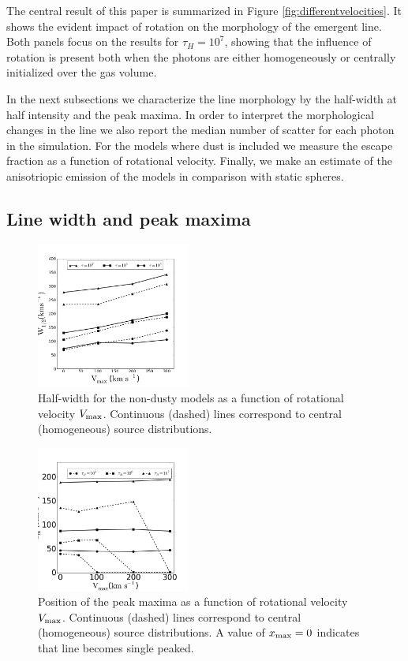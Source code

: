 \documentclass{emulateapj}
\newcommand{\ly}{{\ifmmode{{\rm Ly}\alpha~}\else{Ly$\alpha$~}\fi}}
\begin{document}
The central result of this paper is summarized in Figure
\ref{fig:differentvelocities}. It shows the evident
impact of rotation on the morphology of the emergent \ly line. Both
panels focus on the results for $\tau_{H}=10^{7}$, showing that the
influence of rotation is present both when the photons are either
homogeneously or centrally initialized over the gas volume.  

In the next subsections we characterize the line morphology by
the half-width at half intensity and the peak maxima. In order to
interpret the morphological changes in the line we also report the
median number of scatter for each \ly photon in the
simulation. For the models where dust is included we measure the 
escape fraction as a function of rotational velocity. Finally, we make
an estimate of the anisotriopic emission of the models in comparison
with static spheres.


\subsection{Line width and peak maxima}
\label{sec:widthpeak}


\begin{figure}
    \includegraphics[width=0.45\textwidth]{NewWidthVvsVmax.png}
    \caption{Half-width for the non-dusty models as a function of
      rotational velocity $V_{\rm max}$. Continuous (dashed) lines
      correspond to central (homogeneous) source
      distributions. \label{fig:widthvsvelocity}} 
\end{figure}


\begin{figure}
    \includegraphics[width=0.45\textwidth]{maximumVvsVmax.png}
\caption{Position of the peak maxima as a function of rotational
  velocity $V_{\rm max}$. Continuous (dashed) lines correspond to
  central (homogeneous) source distributions. A value of $x_{\rm
    max}=0$ indicates that line becomes single
  peaked. \label{fig:maximumsvsvelocity}}  
\end{figure}
\end{document}

